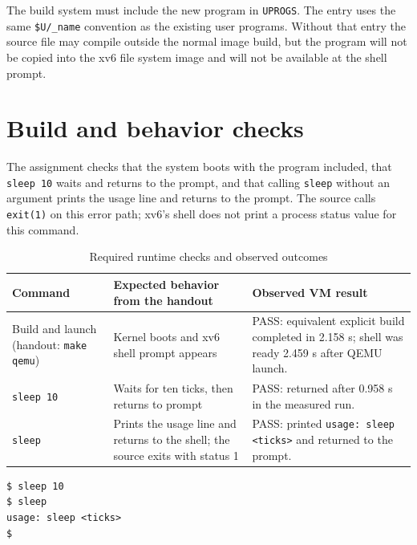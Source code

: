 \documentclass{assets/utmreport}
\begin{document}
The build system must include the new program in \texttt{UPROGS}. The entry uses the same \texttt{\$U/\_\allowbreak name} convention as the existing user programs. Without that entry the source file may compile outside the normal image build, but the program will not be copied into the xv6 file system image and will not be available at the shell prompt.

\section{Build and behavior checks}

The assignment checks that the system boots with the program included, that \texttt{sleep 10} waits and returns to the prompt, and that calling \texttt{sleep} without an argument prints the usage line and returns to the prompt. The source calls \texttt{exit(1)} on this error path; xv6's shell does not print a process status value for this command.

\begin{table}[htbp]
\caption{Required runtime checks and observed outcomes}
\label{tab:sleep-checks}
\centering
\begin{tabularx}{0.95\textwidth}{|Y|Y|Y|}
\hline
\textbf{Command} & \textbf{Expected behavior from the handout} & \textbf{Observed VM result} \\
\hline
Build and launch (handout: \texttt{make qemu}) & Kernel boots and xv6 shell prompt appears & PASS: equivalent explicit build completed in 2.158 s; shell was ready 2.459 s after QEMU launch. \\
\hline
\texttt{sleep 10} & Waits for ten ticks, then returns to prompt & PASS: returned after 0.958 s in the measured run. \\
\hline
\texttt{sleep} & Prints the usage line and returns to the shell; the source exits with status 1 & PASS: printed \texttt{usage: sleep <ticks>} and returned to the prompt. \\
\hline
\end{tabularx}
\end{table}

\noindent\begin{minipage}{\linewidth}
\begin{lstlisting}[caption={Captured sleep program tests}]
$ sleep 10
$ sleep
usage: sleep <ticks>
$
\end{lstlisting}
\end{minipage}\par
\end{document}
